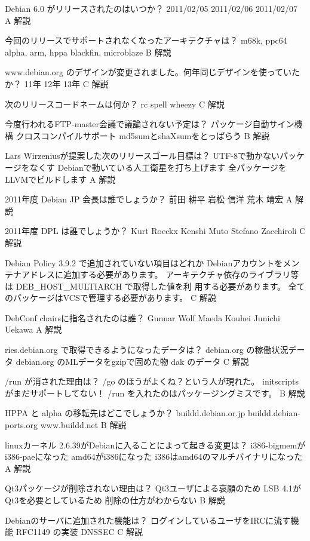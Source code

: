 \santaku
{Debian 6.0 がリリースされたのはいつか？}
{2011/02/05}
{2011/02/06}
{2011/02/07}
{A}
{解説}

\santaku
{今回のリリースでサポートされなくなったアーキテクチャは？}
{m68k, ppc64}
{alpha, arm, hppa}
{blackfin, microblaze}
{B}
{解説}

\santaku
{www.debian.org のデザインが変更されました。何年同じデザインを使っていたか？}
{11年}
{12年}
{13年}
{C}
{解説}

\santaku
{次のリリースコードネームは何か？}
{rc}
{spell} %
{wheezy}
{C}
{解説}

\santaku
{今度行われるFTP-master会議で議論されない予定は？}
{パッケージ自動サイン機構}
{クロスコンパイルサポート}
{md5sumとshaXsumをとっぱらう}
{B}
{解説}

\santaku
{Lars Wirzeniusが提案した次のリリースゴール目標は？}
{UTF-8で動かないパッケージをなくす}
{Debianで動いている人工衛星を打ち上げます}
{全パッケージをLLVMでビルドします}
{A}
{解説}

\santaku
{2011年度 Debian JP 会長は誰でしょうか？}
{前田 耕平}
{岩松 信洋}
{荒木 靖宏}
{A}
{解説}

\santaku
{2011年度 DPL は誰でしょうか？}
{Kurt Roeckx}
{Kenshi Muto}
{Stefano Zacchiroli}
{C}
{解説}

\santaku
{Debian Policy 3.9.2 で追加されていない項目はどれか}
{Debianアカウントをメンテナアドレスに追加する必要があります。}
{アーキテクチャ依存のライブラリ等は DEB\_HOST\_MULTIARCH で取得した値を利
用する必要があります。}
{全てのパッケージはVCSで管理する必要があります。}
{C}
{解説}

\santaku
{DebConf chairsに指名されたのは誰？}
{Gunnar Wolf}
{Maeda Kouhei}
{Junichi Uekawa}
{A}
{解説}

\santaku
{ries.debian.org で取得できるようになったデータは？}
{debian.org の稼働状況データ}
{debian.org のMLデータをgzipで固めた物}
{dak のデータ}
{C}
{解説}

\santaku
{/run が消された理由は？}
{/go のほうがよくね？という人が現れた。}
{initscripts がまだサポートしてない！}
{/run を入れたのはパッケージングミスです。}
{B}
{解説}

\santaku
{HPPA と alpha の移転先はどこでしょうか？}
{buildd.debian.or.jp}
{buildd.debian-ports.org}
{www.buildd.net}
{B}
{解説}

\santaku
{linuxカーネル 2.6.39がDebianに入ることによって起きる変更は？}
{i386-bigmemがi386-paeになった}
{amd64がi386になった}
{i386はamd64のマルチバイナリになった}
{A}
{解説}

\santaku
{Qt3パッケージが削除されない理由は？}
{Qt3ユーザによる哀願のため}
{LSB 4.1がQt3を必要としているため}
{削除の仕方がわからない}
{B}
{解説}

\santaku
{Debianのサーバに追加された機能は？}
{ログインしているユーザをIRCに流す機能}
{RFC1149 の実装}
{DNSSEC}
{C}
{解説}
